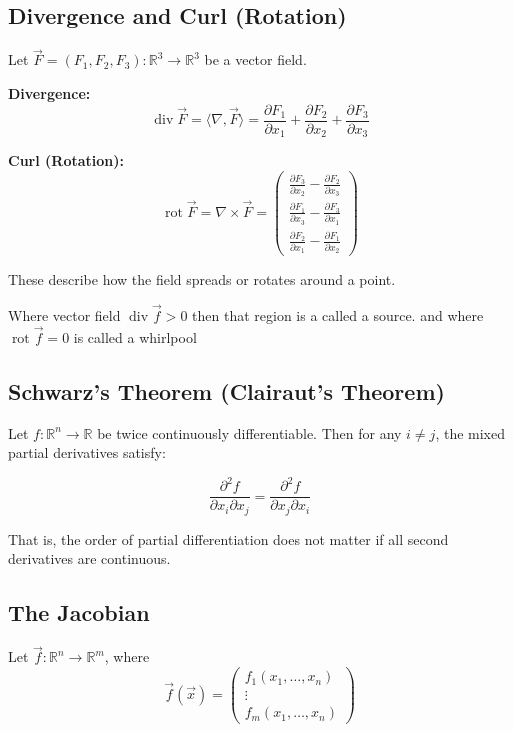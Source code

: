 \subsection{Divergence and Curl (Rotation)}

Let \( \vec{F} = (F_1, F_2, F_3) : \mathbb{R}^3 \to \mathbb{R}^3 \) be a vector field.

\textbf{Divergence:}
\[
\operatorname{div} \vec{F} = \langle\nabla, \vec{F}\rangle = \frac{\partial F_1}{\partial x_1} + \frac{\partial F_2}{\partial x_2} + \frac{\partial F_3}{\partial x_3}
\]

\textbf{Curl (Rotation):}
\[
\operatorname{rot} \vec{F} = \nabla \times \vec{F} = \begin{pmatrix}
\frac{\partial F_3}{\partial x_2} - \frac{\partial F_2}{\partial x_3} \\
\frac{\partial F_1}{\partial x_3} - \frac{\partial F_3}{\partial x_1} \\
\frac{\partial F_2}{\partial x_1} - \frac{\partial F_1}{\partial x_2}
\end{pmatrix}
\]

These describe how the field spreads or rotates around a point.

Where vector field \( \operatorname{div}\vec{f} > 0\) then that region is a called a source.
and where \(\operatorname{rot}\vec{f} = 0\) is called a whirlpool
\subsection{Schwarz’s Theorem (Clairaut’s Theorem)}

Let \( f : \mathbb{R}^n \to \mathbb{R} \) be twice continuously differentiable. Then for any \( i \ne j \), the mixed partial derivatives satisfy:

\[
\frac{\partial^2 f}{\partial x_i \partial x_j} = \frac{\partial^2 f}{\partial x_j \partial x_i}
\]

That is, the order of partial differentiation does not matter if all second derivatives are continuous.

\subsection{The Jacobian}

Let \( \vec{f} : \mathbb{R}^n \to \mathbb{R}^m \), where
\[
\vec{f}(\vec{x}) = \begin{pmatrix}
f_1(x_1, \dots, x_n) \\
\vdots \\
f_m(x_1, \dots, x_n)
\end{pmatrix}
\]

